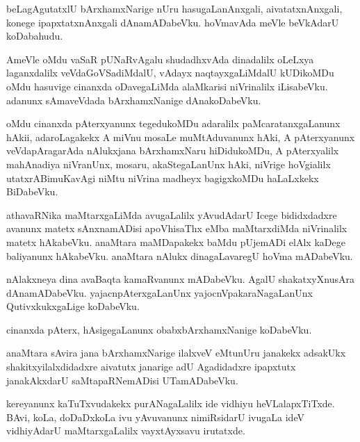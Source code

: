 \documentclass{article}
\begin{document}
\begin{mn}
beLagAgutatxlU  bArxhamxNarige  nUru  hasugaLanAnxgali,  aivatatxnAnxgali,  konege  ipapxtatxnAnxgali  
dAnamADabeVku.  hoVmavAda  meVle  beVkAdarU  koDabahudu.
\end{mn}

\begin{mn}
AmeVle  oMdu  vaSaR  pUNaRvAgalu  shudadhxvAda  dinadalilx  oLeLxya  laganxdalilx  veVdaGoVSadiMdalU,  
vAdayx naqtayxgaLiMdalU  kUDikoMDu  oMdu  hasuvige  cinanxda  oDavegaLiMda  alaMkarisi  niVrinalilx  
iLisabeVku.  adanunx  sAmaveVdada  bArxhamxNanige  dAnakoDabeVku.
\end{mn}

\begin{mn}
oMdu  cinanxda  pAterxyanunx  tegedukoMDu  adaralilx  paMcaratanxgaLanunx  hAkii,  adaroLagakekx  
A  miVnu  mosaLe  muMtAduvanunx  hAki,  A  pAterxyanunx  veVdapAragarAda  nAlukxjana  bArxhamxNaru  
hiDidukoMDu,  A  pAterxyalilx  mahAnadiya  niVranUnx,  mosaru,  akaStegaLanUnx  hAki,  niVrige  
hoVgialilx  utatxrABimuKavAgi  niMtu  niVrina  madheyx  bagigxkoMDu  haLaLxkekx  BiDabeVku.
\end{mn}

\begin{mn}
athavaRNika  maMtarxgaLiMda  avugaLalilx  yAvudAdarU  Icege  bididxdadxre  avanunx  matetx  sAnxnamADisi  
apoVhisaThx  eMba  maMtarxdiMda  niVrinalilx  matetx  hAkabeVku.  anaMtara maMDapakekx  baMdu  pUjemADi  
elAlx kaDege  baliyanunx  hAkabeVku.  anaMtara  nAlukx  dinagaLavaregU  hoVma mADabeVku.  
\end{mn}

\begin{mn}
nAlakxneya  dina  avaBaqta  kamaRvanunx  mADabeVku.  AgalU  shakatxyXnusAra  dAnamADabeVku.  
yajacnpAterxgaLanUnx  yajocnVpakaraNagaLanUnx  QutivxkukxgaLige  koDabeVku.
\end{mn}

\begin{mn}
cinanxda  pAterx,  hAsigegaLanunx  obabxbArxhamxNanige  koDabeVku.
\end{mn}

\begin{mn}
anaMtara  sAvira  jana  bArxhamxNarige  ilalxveV  eMtunUru  janakekx  adsakUkx  shakitxyilalxdidadxre  
aivatutx  janarige  adU  Agadidadxre  ipapxtutx  janakAkxdarU  saMtapaRNemADisi  UTamADabeVku.
\end{mn}

\begin{mn}
kereyanunx  kaTuTxvudakekx  purANagaLalilx  ide  vidhiyu  heVLalapxTiTxde.  BAvi,  koLa,  doDaDxkoLa  
ivu  yAvuvanunx  nimiRsidarU  ivugaLa  ideV  vidhiyAdarU  maMtarxgaLalilx  vayxtAyxsavu  irutatxde.
\end{mn}
\end{document}
